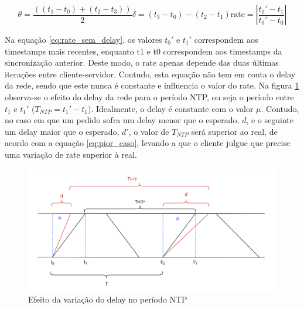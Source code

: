 \begin{subequations}
    \begin{equation} \label{eq:offset}
    \theta = \frac{\left( (t_{\text{1}} - t_{\text{0}}) + (t_{\text{2}} - t_{\text{3}}) \right)}{2} 
    \end{equation}
    
    \begin{equation} \label{eq:delay}
    \delta = (t_{\text{3}} - t_{\text{0}}) - (t_{\text{2}} - t_{\text{1}})
    \end{equation}
    
    \begin{equation} \label{eq:rate_sem_delay}
    \text{{rate}} =\left| \frac{{t_{\text{1}}' - t_{\text{1}}}}{{t_{\text{0}}' - t_{\text{0}}}} \right|
    \end{equation}
    \label{eq:parametros}
\end{subequations}

Na equação \ref{eq:rate_sem_delay}, os valores $t_{\text{0}}'$ e $t_{\text{1}}'$ correspondem aos timestamps mais recentes, enquanto t1 e t0 correspondem aos timestamps da sincronização anterior. Deste modo, o rate apenas depende das duas últimas iterações entre cliente-servidor. Contudo, esta equação não tem em conta o delay da rede, sendo que este nunca é constante e influencia o valor do rate. Na figura \ref{fig:diagramaNTP_delays} observa-se o efeito do delay da rede para o período NTP, ou seja o período entre $t_1$ e $t_1'$ ($T_{NTP} = t_1'-t_1$). Idealmente, o delay é constante com o valor $\mu$. Contudo, no caso em que um pedido sofra um delay menor que o esperado, $d$, e o seguinte um delay maior que o esperado, $d'$, o valor de $T_{NTP}$ será superior ao real, de acordo com a equação \ref{eq:pior_caso}, levando a que o cliente julgue que precise uma variação de rate superior à real. 


\begin{figure}[h]
        \centering
        \includegraphics[width=1.0\linewidth]{figures/diagrama_ntp_delay.png}
        \caption{Efeito da variação do delay no período NTP}
        \label{fig:diagramaNTP_delays}
\end{figure}

